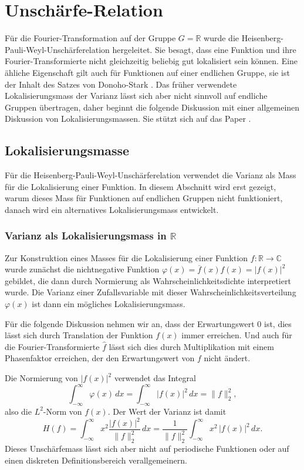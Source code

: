 %
%
%
\section{Unschärfe-Relation
\label{buch:diskret:section:unschaerfe}}
Für die Fourier-Transformation auf der Gruppe $G=\mathbb{R}$ wurde die
Heisenberg-Pauli-Weyl-Un\-schärfe\-re\-la\-tion hergeleitet.
Sie besagt, dass eine Funktion und ihre Fourier-Transformierte nicht
gleichzeitig beliebig gut lokalisiert sein können.
Eine ähliche Eigenschaft gilt auch für Funktionen auf einer endlichen
Gruppe, sie ist der Inhalt des Satzes von Donoho-Stark
\cite{buch:donoho-stark}.
Das früher verwendete Lokalisierungsmass der Varianz lässt sich aber
nicht sinnvoll auf endliche Gruppen übertragen, daher beginnt die 
folgende Diskussion mit einer allgemeinen Diskussion von Lokalisierungsmassen.
Sie stützt sich auf das Paper \cite{buch:widgerson}.

%
%
\subsection{Lokalisierungsmasse}
Für die Heisenberg-Pauli-Weyl-Unschärferelation verwendet die Varianz
als Mass für die Lokalisierung einer Funktion.
In diesem Abschnitt wird erst gezeigt, warum dieses Mass für Funktionen
auf endlichen Gruppen nicht funktioniert, danach wird ein alternatives
Lokalisierungsmass entwickelt.

\subsubsection{Varianz als Lokalisierungsmass in $\mathbb{R}$}
Zur Konstruktion eines Masses für die Lokalisierung einer Funktion
$f\colon \mathbb{R}\to\mathbb{C}$ wurde zunächst die nichtnegative
Funktion $\varphi(x) = \overline{f}(x)f(x) = |f(x)|^2$ gebildet,
die dann durch Normierung als Wahrscheinlichkeitsdichte interpretiert
wurde.
Die Varianz einer Zufallsvariable mit dieser Wahrscheinlichkeitsverteilung
$\varphi(x)$ ist dann ein mögliches Lokalisierungsmass.

Für die folgende Diskussion nehmen wir an, dass der Erwartungswert $0$
ist, dies lässt sich durch Translation der Funktion $f(x)$ immer erreichen.
Und auch für die Fourier-Transformierte $\hat{f}$ lässt sich dies
durch Multiplikation mit einem Phasenfaktor erreichen, der den
Erwartungswert von $f$ nicht ändert.

Die Normierung von $|f(x)|^2$ verwendet das Integral
\[
\int_{-\infty}^\infty \varphi(x) \,dx
=
\int_{-\infty}^\infty |f(x)|^2\,dx
=
\|f\|_2^2,
\]
also die $L^2$-Norm von $f(x)$.
Der Wert der Varianz ist damit
\[
H(f)
=
\int_{-\infty}^{\infty}
x^2
\frac{|f(x)|^2}{\|f\|_2^2} \,dx
=
\frac{1}{\|f\|_2^2}
\int_{-\infty}^{\infty} x^2\,|f(x)|^2\,dx.
\]
Dieses Unschärfemass lässt sich aber nicht auf periodische Funktionen
oder auf einen diskreten Definitionsbereich verallgemeinern.

